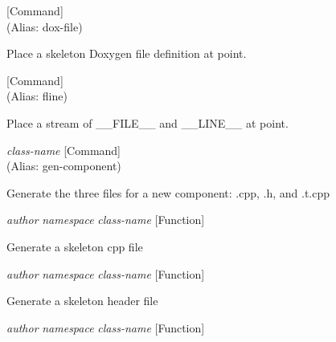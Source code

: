 \vspace{1em}
\noindent
{}
\usebox{\funcname}
 \hfill [Command]\\%
 (Alias: dox-file)

\begin{doc-string}
Place a skeleton Doxygen file definition at point.
\end{doc-string}

\vspace{1em}
\noindent
{}
\usebox{\funcname}
 \hfill [Command]\\%
 (Alias: fline)

\begin{doc-string}
Place a stream of \_\_FILE\_\_ and \_\_LINE\_\_ at point.
\end{doc-string}

\vspace{1em}
\noindent
{}
\usebox{\funcname}\emph{class-name}
 \hfill [Command]\\%
 (Alias: gen-component)

\begin{doc-string}
Generate the three files for a new component: .cpp, .h, and .t.cpp
\end{doc-string}

\vspace{1em}
\noindent
{}
\usebox{\funcname}\emph{author} \emph{namespace} \emph{class-name}
 \hfill [Function]

\begin{doc-string}
Generate a skeleton cpp file
\end{doc-string}

\vspace{1em}
\noindent
{}
\usebox{\funcname}\emph{author} \emph{namespace} \emph{class-name}
 \hfill [Function]

\begin{doc-string}
Generate a skeleton header file
\end{doc-string}

\vspace{1em}
\noindent
{}
\usebox{\funcname}\emph{author} \emph{namespace} \emph{class-name}
 \hfill [Function]

